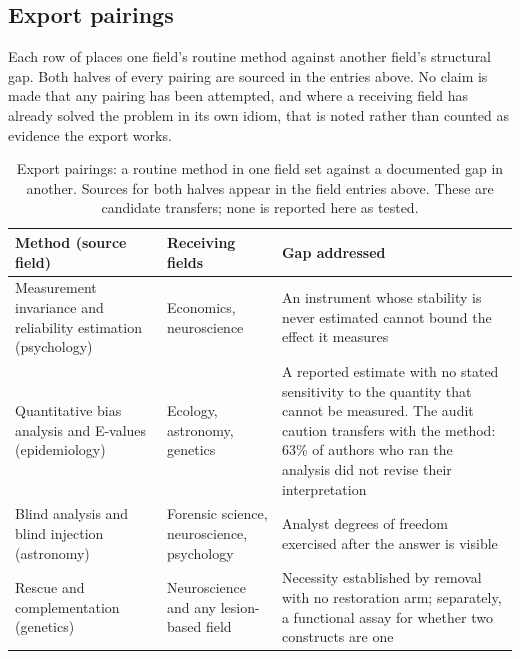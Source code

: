 \documentclass{article}
\begin{document}
\subsection{Export pairings}

Each row of  places one field's routine method against another field's structural gap. Both halves of every pairing are sourced in the entries above. No claim is made that any pairing has been attempted, and where a receiving field has already solved the problem in its own idiom, that is noted rather than counted as evidence the export works.

\begin{table}[H]
\centering\small
\caption{Export pairings: a routine method in one field set against a documented gap in another. Sources for both halves appear in the field entries above. These are candidate transfers; none is reported here as tested.}
\label{tab:field-exports}
\setlength{\tabcolsep}{4pt}\renewcommand{\arraystretch}{1.0}
\begin{tabular}{@{}>{\raggedright\arraybackslash}p{3.4cm}>{\raggedright\arraybackslash}p{2.6cm}>{\raggedright\arraybackslash}p{8.9cm}@{}}
\toprule
Method (source field) & Receiving fields & Gap addressed \\
\midrule
Measurement invariance and reliability estimation (psychology) & Economics, neuroscience & An instrument whose stability is never estimated cannot bound the effect it measures \citep{hussey2020hidden, gillen2019experimenting, elliott2020test} \\
\midrule
Quantitative bias analysis and E-values (epidemiology) & Ecology, astronomy, genetics & A reported estimate with no stated sensitivity to the quantity that cannot be measured. The audit caution transfers with the method: 63\% of authors who ran the analysis did not revise their interpretation \citep{vanderweele2017sensitivity, petersen2021systematic} \\
\midrule
Blind analysis and blind injection (astronomy) & Forensic science, neuroscience, psychology & Analyst degrees of freedom exercised after the answer is visible \citep{klein2005blind, botviniknezer2020variability, simmons2011false} \\
\midrule
Rescue and complementation (genetics) & Neuroscience and any lesion-based field & Necessity established by removal with no restoration arm; separately, a functional assay for whether two constructs are one \citep{strande2017evaluating, crede2017much} \\
\midrule

\end{tabular}
\end{table}
\end{document}
